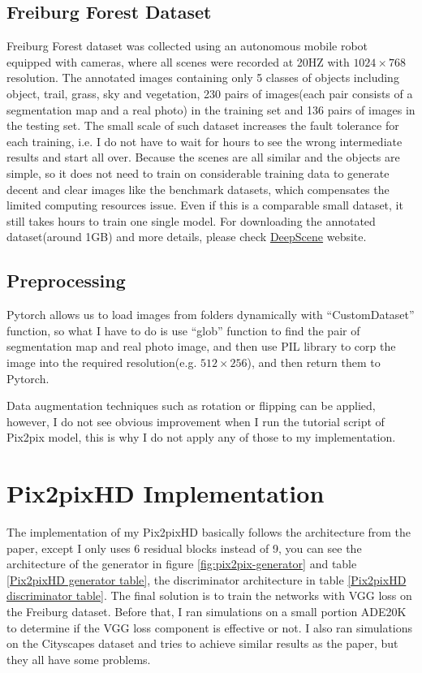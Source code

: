 \subsection{Freiburg Forest Dataset}
\label{sec:freiburg}
Freiburg Forest dataset was collected using an autonomous mobile robot equipped with 
cameras, where all scenes were recorded at 20HZ with $1024\times768$ resolution. The 
annotated images containing only 5 classes of objects including object, trail, grass, sky 
and vegetation, 230 pairs of images(each pair consists of a segmentation
map and a real photo) in the training set and 136 pairs of images in the testing set. 
The small scale of such dataset increases the fault tolerance for each training, i.e. I do 
not have to wait for hours to see the wrong intermediate results and start all over. 
Because the scenes are all similar and the objects are simple, so it does not need to train
on considerable training data to generate decent and clear images like the benchmark datasets,
which compensates the limited computing resources issue.
Even if this is a comparable small dataset, it still takes hours to train one single model. 
For downloading the annotated dataset(around 1GB) and more details, please 
check \href{http://deepscene.cs.uni-freiburg.de}{DeepScene} website.
\subsection{Preprocessing}
Pytorch allows us to load images from folders dynamically with “CustomDataset” function, so 
what I have to do is use “glob” function to find the pair of segmentation map and real photo 
image, and then use PIL library to corp the image into the required resolution(e.g. $512\times256$), 
and then return them to Pytorch.

Data augmentation techniques such as rotation or flipping can be applied, however, 
I do not see obvious improvement when I run the tutorial script of Pix2pix model, 
this is why I do not apply any of those to my implementation.

\section{Pix2pixHD Implementation}
The implementation of my Pix2pixHD basically follows the architecture from the paper, 
except I only uses 6 residual blocks instead of 9, you can see the architecture of the 
generator in figure \ref{fig:pix2pix-generator} and table \ref{Pix2pixHD generator table},  
the discriminator architecture in table \ref{Pix2pixHD discriminator table}. The final
solution is to train the networks with VGG loss on the Freiburg dataset. Before that, 
I ran simulations on a small portion ADE20K to determine if the VGG loss component is 
effective or not. I also ran simulations on the Cityscapes dataset and tries to achieve similar 
results as the paper, but they all have some problems. 

